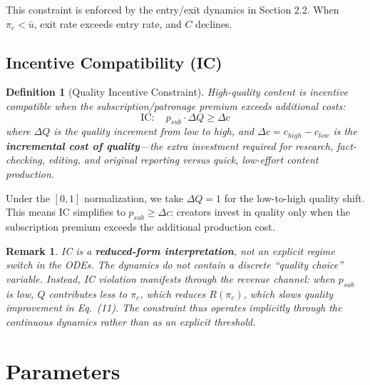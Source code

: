 \documentclass[11pt,a4paper]{article}
\newtheorem{definition}{Definition}
\newtheorem{remark}{Remark}
\begin{document}
This constraint is enforced by the entry/exit dynamics in Section 2.2. When $\pi_c < \bar{u}$, exit rate exceeds entry rate, and $C$ declines.

\subsection{Incentive Compatibility (IC)}

\begin{definition}[Quality Incentive Constraint]
High-quality content is incentive compatible when the subscription/patronage premium exceeds additional costs:
\begin{equation}
\text{IC}: \quad p_{sub} \cdot \Delta Q \geq \Delta c
\end{equation}
where $\Delta Q$ is the quality increment from low to high, and $\Delta c = c_{high} - c_{low}$ is the \textbf{incremental cost of quality}---the extra investment required for research, fact-checking, editing, and original reporting versus quick, low-effort content production.
\end{definition}

Under the $[0,1]$ normalization, we take $\Delta Q = 1$ for the low-to-high quality shift. This means IC simplifies to $p_{sub} \geq \Delta c$: creators invest in quality only when the subscription premium exceeds the additional production cost.

\begin{remark}
IC is a \textbf{reduced-form interpretation}, not an explicit regime switch in the ODEs. The dynamics do not contain a discrete ``quality choice'' variable. Instead, IC violation manifests through the revenue channel: when $p_{sub}$ is low, $Q$ contributes less to $\pi_c$, which reduces $R(\pi_c)$, which slows quality improvement in Eq.\ (11). The constraint thus operates implicitly through the continuous dynamics rather than as an explicit threshold.
\end{remark}

\section{Parameters}
\end{document}
